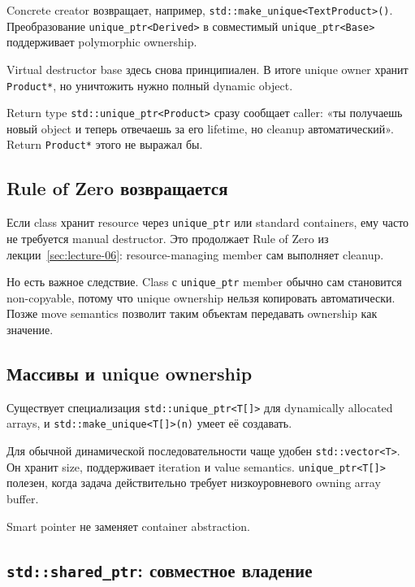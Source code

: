 Concrete creator возвращает, например,
\texttt{std::make\_unique<TextProduct>()}. Преобразование
\texttt{unique\_ptr<Derived>} в совместимый \texttt{unique\_ptr<Base>}
поддерживает polymorphic ownership.

Virtual destructor base здесь снова принципиален. В итоге unique owner хранит
\texttt{Product*}, но уничтожить нужно полный dynamic object.

\begin{whybox}
Return type \texttt{std::unique\_ptr<Product>} сразу сообщает caller:
«ты получаешь новый object и теперь отвечаешь за его lifetime, но cleanup
автоматический». Return \texttt{Product*} этого не выражал бы.
\end{whybox}

\subsection{Rule of Zero возвращается}

Если class хранит resource через \texttt{unique\_ptr} или standard containers,
ему часто не требуется manual destructor. Это продолжает Rule of Zero из
лекции~\ref{sec:lecture-06}: resource-managing member сам выполняет cleanup.

Но есть важное следствие. Class с \texttt{unique\_ptr} member обычно сам
становится non-copyable, потому что unique ownership нельзя копировать
автоматически. Позже move semantics позволит таким объектам передавать
ownership как значение.

\subsection{Массивы и unique ownership}

Существует специализация \texttt{std::unique\_ptr<T[]>} для dynamically allocated
arrays, и \texttt{std::make\_unique<T[]>(n)} умеет её создавать.

Для обычной динамической последовательности чаще удобен
\texttt{std::vector<T>}. Он хранит size, поддерживает iteration и value semantics.
\texttt{unique\_ptr<T[]>} полезен, когда задача действительно требует
низкоуровневого owning array buffer.

Smart pointer не заменяет container abstraction.

\subsection{\texttt{std::shared\_ptr}: совместное владение}

